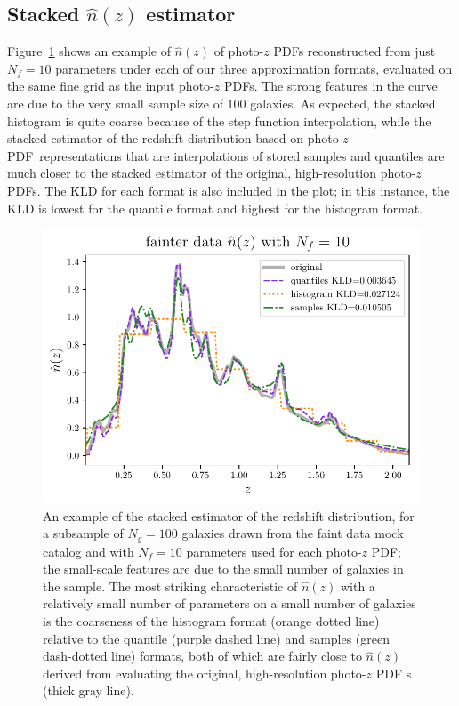 \documentclass[\docopts]{\docclass}
\newcommand{\pz}{photo-$z$ PDF}
\newcommand{\ssdata}{faint\xspace}
\begin{document}
\subsection{Stacked $\hat{n}(z)$ estimator}
\label{sec:stacked_results}

Figure~\ref{fig:stacked} shows an example of $\hat{n}(z)$ of \pz s 
reconstructed from just $N_{f}=10$ parameters under each of our three 
approximation formats, evaluated on the same fine grid as the input \pz s.
The strong features in the curve are due to the very small sample size of $100$ 
galaxies.
As expected, the stacked histogram is quite coarse because of the step function 
interpolation, while the stacked estimator of the redshift distribution based 
on \pz\ representations that are interpolations of stored samples and quantiles 
are much closer to the stacked estimator of the original, high-resolution \pz s.
The KLD for each format is also included in the plot; in this instance, the KLD 
is lowest for the quantile format and highest for the histogram format.

\begin{figure}
  \begin{center}
    \includegraphics[width=\columnwidth]{figures/stacked.pdf}
    \caption{An example of the stacked estimator of the redshift distribution, 
for a subsample of $N_{g}=100$ galaxies drawn from the \ssdata data mock 
catalog and with $N_{f}=10$ parameters used for each \pz; the small-scale 
features are due to the small number of galaxies in the sample.
    The most striking characteristic of $\hat{n}(z)$ with a relatively small 
number of parameters on a small number of galaxies is the coarseness of the 
histogram format (orange dotted line) relative to the quantile (purple dashed 
line) and samples (green dash-dotted line) formats, both of which are fairly 
close to $\hat{n}(z)$ derived from evaluating the original, high-resolution \pz 
s (thick gray line).
    \label{fig:stacked}}
  \end{center}
\end{figure}
\end{document}
